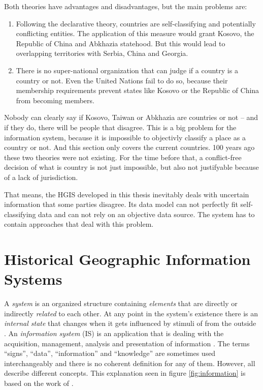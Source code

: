 Both theories have advantages and disadvantages, but the main problems are:
\begin{enumerate}
  \item Following the declarative theory, countries are self-classifying and potentially conflicting entities. The application of this measure would grant Kosovo, the Republic of China and Abkhazia statehood. But this would lead to overlapping territories with Serbia, China and Georgia.
  \item There is no super-national organization that can judge if a country is a country or not. Even the United Nations fail to do so, because their membership requirements prevent states like Kosovo or the Republic of China from becoming members.
\end{enumerate}

Nobody can clearly say if Kosovo, Taiwan or Abkhazia are countries or not -- and if they do, there will be people that disagree. This is a big problem for the information system, because it is impossible to objectivly classify a place as a country or not. And this section only covers the current countries. 100 years ago these two theories were not existing. For the time before that, a conflict-free decision of what is country is not just impossible, but also not justifyable because of a lack of jurisdiction.

That means, the HGIS developed in this thesis inevitably deals with uncertain information that some parties disagree. Its data model can not perfectly fit self-classifying data and can not rely on an objective data source. The system has to contain approaches that deal with this problem.



\section{Historical Geographic Information Systems} %
\label{sec:historical_geographic_information_systems}

A \emph{system} is an organized structure containing \emph{elements} that are directly or indirectly \emph{related} to each other. At any point in the system's existence there is an \emph{internal state} that changes when it gets influenced by stimuli of from the outside \cite{system}. An \emph{information system} (IS) is an application that is dealing with the acquisition, management, analysis and presentation of information \cite{informationSystem}. The terms ``signs'', ``data'', ``information'' and ``knowledge'' are sometimes used interchangeably and there is no coherent definition for any of them. However, all describe different concepts. This explanation seen in figure \ref{fig:information} is based on the work of \cite{datinfwis}.


